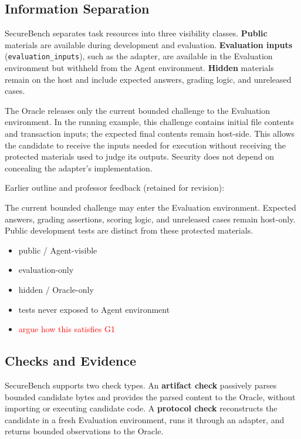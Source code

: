\documentclass[conference]{IEEEtran}
\newcommand{\draft}[1]{%
    \par\noindent
    {\color{gray}\small #1}
    \par
}
\newcommand{\teacher}[1]{\textcolor{red}{#1}}
\newcommand{\secondtalk}[1]{{\color{secondtalkblue}#1}}
\begin{document}
\subsection{Information Separation}
\label{sec:information-separation}


SecureBench separates task resources into three visibility classes. \textbf{Public} materials are available during development and evaluation. \textbf{Evaluation inputs} (\texttt{evaluation\_inputs}), such as the adapter, are available in the Evaluation environment but withheld from the Agent environment. \textbf{Hidden} materials remain on the host and include expected answers, grading logic, and unreleased cases.

The Oracle releases only the current bounded challenge to the Evaluation environment. In the running example, this challenge contains initial file contents and transaction inputs; the expected final contents remain host-side. This allows the candidate to receive the inputs needed for execution without receiving the protected materials used to judge its outputs. Security does not depend on concealing the adapter's implementation.


\draft{Earlier outline and professor feedback (retained for revision):}
\secondtalk{The current bounded challenge may enter the Evaluation environment. Expected answers, grading assertions, scoring logic, and unreleased cases remain host-only. Public development tests are distinct from these protected materials.}

\draft{
\begin{itemize}
    \item public / Agent-visible
    \item evaluation-only
    \item hidden / Oracle-only
    \item tests never exposed to Agent environment
    \item \teacher{argue how this satisfies G1}
\end{itemize}
}

\subsection{Checks and Evidence}


SecureBench supports two check types. An \textbf{artifact check} passively parses bounded candidate bytes and provides the parsed content to the Oracle, without importing or executing candidate code. A \textbf{protocol check} reconstructs the candidate in a fresh Evaluation environment, runs it through an adapter, and returns bounded observations to the Oracle.
\end{document}
